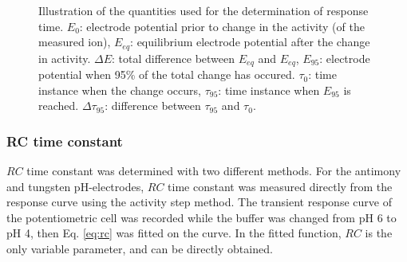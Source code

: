 \begin{figure}
\centering
{}
\caption[Illustration of the parameters used for the determination of response time.]{Illustration of the quantities used for the determination of response time.
$E_0$: electrode potential prior to change in the activity (of the measured ion), $E_{eq}$: equilibrium electrode potential after the change in activity.
$\Delta E$: total difference between $E_{eq}$ and $E_{eq}$, $E_{95}$: electrode potential when 95\% of the total change has occured.
$\tau_0$: time instance when the change occurs, $\tau_{95}$: time instance when $E_{95}$ is reached.
$\Delta \tau_{95}$: difference between $\tau_{95}$ and $\tau_0$.}
\label{fig:response_time_explained}
\end{figure}

			\subsubsection{RC time constant}
$RC$ time constant was determined with two different methods.
For the antimony and tungsten pH-electrodes, $RC$ time constant was measured directly from the response curve using the activity step method.
The transient response curve of the potentiometric cell was recorded while the buffer was changed from pH 6 to pH 4, then Eq. \ref{eq:rc} was fitted on the curve.
In the fitted function, $RC$ is the only variable parameter, and can be directly obtained.

